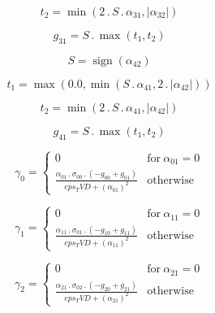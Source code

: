 \documentclass{article}
\begin{document}
\begin{dmath}t_{2} = \min\left(2 \,.\, S \,.\, \alpha_{31}, \left|{\alpha_{32}}\right|\right)\end{dmath}

\begin{dmath}g_{31} = S \,.\, \max\left(t_{1}, t_{2}\right)\end{dmath}

\begin{dmath}S = \operatorname{sign}{\left (\alpha_{42} \right )}\end{dmath}

\begin{dmath}t_{1} = \max\left(0.0, \min\left(S \,.\, \alpha_{41}, 2 \,.\, \left|{\alpha_{42}}\right|\right)\right)\end{dmath}

\begin{dmath}t_{2} = \min\left(2 \,.\, S \,.\, \alpha_{41}, \left|{\alpha_{42}}\right|\right)\end{dmath}

\begin{dmath}g_{41} = S \,.\, \max\left(t_{1}, t_{2}\right)\end{dmath}

\begin{dmath}\gamma_{0} = \begin{cases} 0 & \text{for}\: \alpha_{01} = 0 \\\frac{\alpha_{01} \,.\, \sigma_{0 0} \,.\, \left(- g_{00} + g_{01}\right)}{eps_TVD + \left(\alpha_{01} \right)^{2}} & \text{otherwise} \end{cases}\end{dmath}

\begin{dmath}\gamma_{1} = \begin{cases} 0 & \text{for}\: \alpha_{11} = 0 \\\frac{\alpha_{11} \,.\, \sigma_{0 1} \,.\, \left(- g_{10} + g_{11}\right)}{eps_TVD + \left(\alpha_{11} \right)^{2}} & \text{otherwise} \end{cases}\end{dmath}

\begin{dmath}\gamma_{2} = \begin{cases} 0 & \text{for}\: \alpha_{21} = 0 \\\frac{\alpha_{21} \,.\, \sigma_{0 2} \,.\, \left(- g_{20} + g_{21}\right)}{eps_TVD + \left(\alpha_{21} \right)^{2}} & \text{otherwise} \end{cases}\end{dmath}
\end{document}
